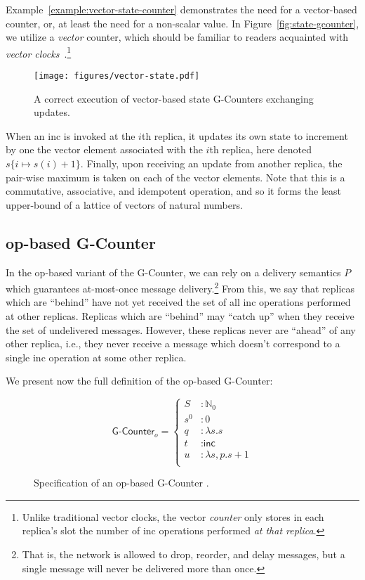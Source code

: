 Example~\ref{example:vector-state-counter} demonstrates the need for a
vector-based counter, or, at least the need for a non-scalar value. In
Figure~\ref{fig:state-gcounter}, we utilize a \emph{vector} counter, which
should be familiar to readers acquainted with \emph{vector
clocks}~\citep{lamport78}.\footnote{Unlike traditional vector clocks, the vector
\emph{counter} only stores in each replica's slot the number of \textsf{inc}
operations performed \emph{at that replica}.}

\begin{figure}[H]
  \centering
  \texttt{[image: figures/vector-state.pdf]}
    \caption{A correct execution of vector-based state G-Counters exchanging
      updates.}
\end{figure}

When an \textsf{inc} is invoked at the $i$th replica, it updates its own state
to increment by one the vector element associated with the $i$th replica, here
denoted $s\{i \mapsto s(i) + 1\}$. Finally, upon receiving an update from
another replica, the pair-wise maximum is taken on each of the vector elements.
Note that this is a commutative, associative, and idempotent operation, and so
it forms the least upper-bound of a lattice of vectors of natural numbers.

\subsection{op-based G-Counter}

In the op-based variant of the G-Counter, we can
rely on a delivery semantics $P$ which guarantees at-most-once message
delivery.\footnote{That is, the network is allowed to drop, reorder, and delay
messages, but a single message will never be delivered more than once.} From
this, we say that replicas which are ``behind'' have not yet received the set of
all \textsf{inc} operations performed at other replicas. Replicas which are
``behind'' may ``catch up'' when they receive the set of undelivered messages.
However, these replicas never are ``ahead'' of any other replica, i.e., they
never receive a message which doesn't correspond to a single \textsf{inc}
operation at some other replica.

We present now the full definition of the op-based G-Counter:

\begin{figure}[H]
  \centering
  \[
    \textsf{G-Counter}_o = \left\{\begin{aligned}
      S &: \mathbb{N}_0 \\
      s^0 &: 0 \\
      q &: \lambda s. s \\
      t &: \textsf{inc} \\
      u &: \lambda s,p. s + 1 \\
    \end{aligned}\right.
  \]
  \caption{Specification of an op-based \textsf{G-Counter} \CRDT.}
\end{figure}

